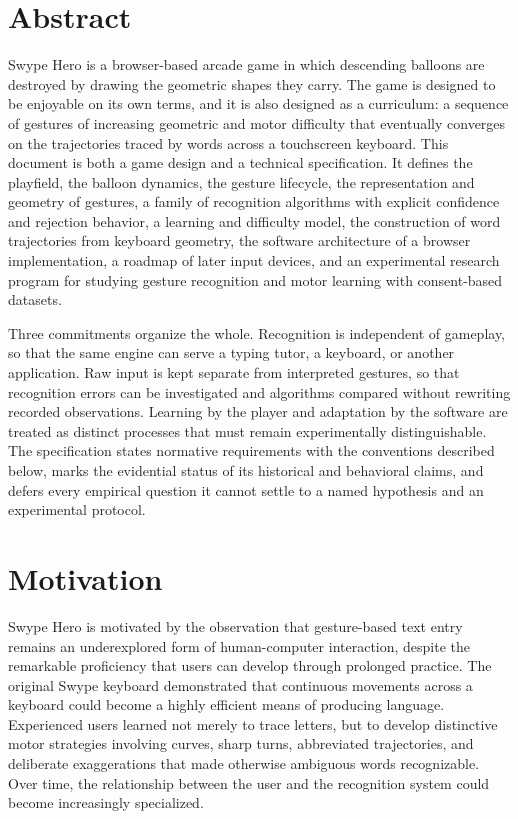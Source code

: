 \chapter*{Abstract}

Swype Hero is a browser-based arcade game in which descending balloons are destroyed by drawing the geometric shapes they carry. The game is designed to be enjoyable on its own terms, and it is also designed as a curriculum: a sequence of gestures of increasing geometric and motor difficulty that eventually converges on the trajectories traced by words across a touchscreen keyboard. This document is both a game design and a technical specification. It defines the playfield, the balloon dynamics, the gesture lifecycle, the representation and geometry of gestures, a family of recognition algorithms with explicit confidence and rejection behavior, a learning and difficulty model, the construction of word trajectories from keyboard geometry, the software architecture of a browser implementation, a roadmap of later input devices, and an experimental research program for studying gesture recognition and motor learning with consent-based datasets.

Three commitments organize the whole. Recognition is independent of gameplay, so that the same engine can serve a typing tutor, a keyboard, or another application. Raw input is kept separate from interpreted gestures, so that recognition errors can be investigated and algorithms compared without rewriting recorded observations. Learning by the player and adaptation by the software are treated as distinct processes that must remain experimentally distinguishable. The specification states normative requirements with the conventions described below, marks the evidential status of its historical and behavioral claims, and defers every empirical question it cannot settle to a named hypothesis and an experimental protocol.

\chapter*{Motivation}

Swype Hero is motivated by the observation that gesture-based text entry remains an underexplored form of human-computer interaction, despite the remarkable proficiency that users can develop through prolonged practice. The original Swype keyboard demonstrated that continuous movements across a keyboard could become a highly efficient means of producing language. Experienced users learned not merely to trace letters, but to develop distinctive motor strategies involving curves, sharp turns, abbreviated trajectories, and deliberate exaggerations that made otherwise ambiguous words recognizable. Over time, the relationship between the user and the recognition system could become increasingly specialized.

